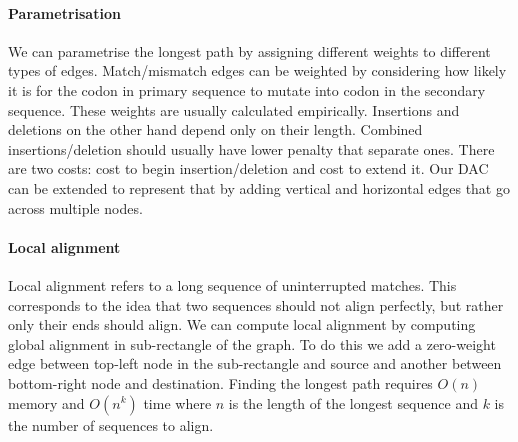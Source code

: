 \documentclass{report}
\begin{document}
\paragraph{Parametrisation}
We can parametrise the longest path by assigning different weights to different types of edges.
Match/mismatch edges can be weighted by considering how likely it is for the codon in primary sequence to mutate into codon in the secondary sequence.
These weights are usually calculated empirically.
Insertions and deletions on the other hand depend only on their length.
Combined insertions/deletion should usually have lower penalty that separate ones.
There are two costs: cost to begin insertion/deletion and cost to extend it.
Our DAC can be extended to represent that by adding vertical and horizontal edges that go across multiple nodes.
\paragraph{Local alignment}
Local alignment refers to a long sequence of uninterrupted matches.
This corresponds to the idea that two sequences should not align perfectly, but rather only their ends should align.
We can compute local alignment by computing global alignment in sub-rectangle of the graph.
To do this we add a zero-weight edge between top-left node in the sub-rectangle and source and another between bottom-right node and destination.
Finding the longest path requires $O(n)$ memory and $O(n^k)$ time where $n$ is the length of the longest sequence and $k$ is the number of sequences to align.
\end{document}
